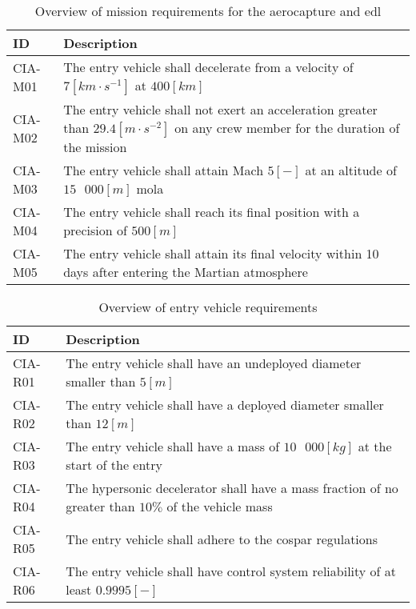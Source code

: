 \begin{table}[h]
	\caption[Overview of mission requirements for the aerocapture and \acrlong{edl}]{Overview of mission requirements for the aerocapture and \gls{edl}}
	\label{tab:misreq} 
	\begin{tabular}{|p{}|p{}|}
    \hline
    \textbf{ID}          & \textbf{Description}                                                                                                      \\ \hline \hline
    CIA-M01& The entry vehicle shall decelerate from a velocity of $7 \left[km\cdot s ^{-1}\right]$ at $400 \left[km\right]$  \\ \hline
    CIA-M02 & The entry vehicle shall not exert an acceleration greater than $29.4 \left[ m \cdot s^{-2}\right]$ on any crew member for the duration of the mission			\\ \hline
    	CIA-M03 & The entry vehicle shall attain Mach $5 [-]$ at an altitude of $15\mbox{ }000 [m]$  \gls{mola} \\ \hline
    	CIA-M04 & The entry vehicle shall reach its final position with a precision of $500 \left[m\right]$\\ \hline
    	CIA-M05 & The entry vehicle shall attain its final velocity within 10 days after entering the Martian atmosphere \\ \hline
    \end{tabular}
\end{table}

\begin{table}[h]
	\caption{Overview of entry vehicle requirements} 
	\label{tab:vehreq}
	\begin{tabular}{|p{}|p{}|}
		\hline
		\textbf{ID}          & \textbf{Description}                                                                                                     \\ \hline \hline
		CIA-R01 & The entry vehicle shall have an undeployed diameter smaller than $5 \left[m\right]$                         				            \\ \hline
		CIA-R02 & The entry vehicle shall have a deployed diameter smaller than $12 \left[m\right]$                         				            \\ \hline	
		CIA-R03 & The entry vehicle shall have a mass of $10\mbox{ }000 \left[kg\right]$ at the start of the entry                       				            \\ \hline
		CIA-R04 & The hypersonic decelerator shall have a mass fraction of no greater than $10\%$ of the vehicle mass  \\ \hline
		CIA-R05 &  The entry vehicle shall adhere to the \gls{cospar} regulations \\ \hline
		CIA-R06 &  The entry vehicle shall have control system reliability of at least $0.9995 \left[-\right]$  \\ \hline
	\end{tabular}
\end{table}